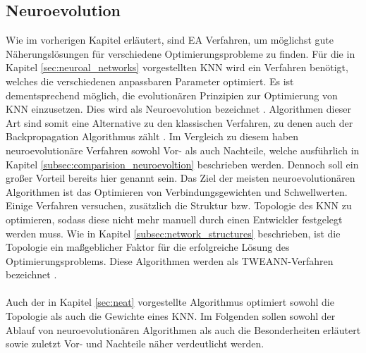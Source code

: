 \subsection{Neuroevolution}
\label{subsec:neuroevolution}
Wie im vorherigen Kapitel erläutert, sind \ac{EA} Verfahren, um möglichst gute Näherungslösungen für verschiedene Optimierungsprobleme zu finden. Für die in Kapitel \ref{sec:neuroal_networks} vorgestellten \ac{KNN} wird ein Verfahren benötigt, welches die verschiedenen anpassbaren Parameter optimiert. Es ist dementsprechend möglich, die evolutionären Prinzipien zur Optimierung von \ac{KNN} einzusetzen. Dies wird als Neuroevolution bezeichnet \cite{meisner2009neurostrategies}. Algorithmen dieser Art sind somit eine Alternative zu den klassischen Verfahren, zu denen auch der Backpropagation Algorithmus zählt \cite{whitley1993genetic}. Im Vergleich zu diesem haben neuroevolutionäre Verfahren sowohl Vor- als auch Nachteile, welche ausführlich in Kapitel \ref{subsec:comparision_neuroevoltion} beschrieben werden. Dennoch soll ein großer Vorteil bereits hier genannt sein. Das Ziel der meisten neuroevolutionären Algorithmen ist das Optimieren von Verbindungsgewichten und Schwellwerten. Einige Verfahren versuchen, zusätzlich die Struktur bzw. Topologie des \ac{KNN} zu optimieren, sodass diese nicht mehr manuell durch einen Entwickler festgelegt werden muss. Wie in Kapitel \ref{subsec:network_structures} beschrieben, ist die Topologie ein maßgeblicher Faktor für die erfolgreiche Lösung des Optimierungsproblems. Diese Algorithmen werden als \ac{TWEANN}-Verfahren bezeichnet \cite{stanley2002evolving}. 
\\\\
Auch der in Kapitel \ref{sec:neat} vorgestellte Algorithmus optimiert sowohl die Topologie als auch die Gewichte eines \ac{KNN}. Im Folgenden sollen sowohl der Ablauf von neuroevolutionären Algorithmen als auch die Besonderheiten erläutert sowie zuletzt Vor- und Nachteile näher verdeutlicht werden.

